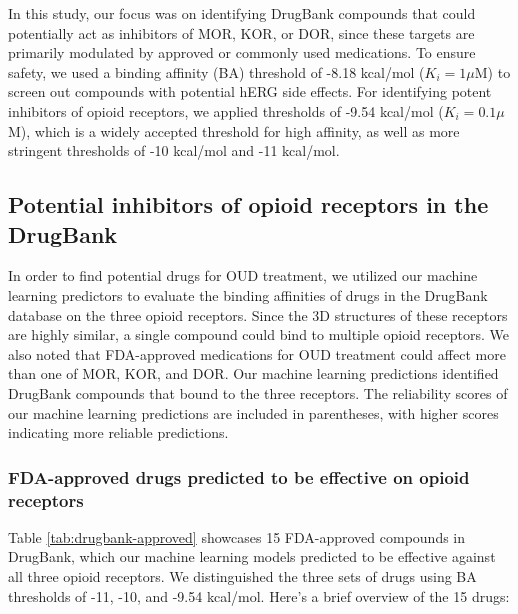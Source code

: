 \documentclass[10pt]{article}
\begin{document}
		
		In this study, our focus was on identifying DrugBank compounds that could potentially act as inhibitors of MOR, KOR, or DOR, since these targets are primarily modulated by approved or commonly used medications. To ensure safety, we used a binding affinity (BA) threshold of -8.18 kcal/mol ($K_i=1\mu$M) to screen out compounds with potential hERG side effects. For identifying potent inhibitors of opioid receptors, we applied thresholds of -9.54 kcal/mol ($K_i=0.1\mu$M), which is a widely accepted threshold for high affinity\cite{flower2002drug}, as well as more stringent thresholds of -10 kcal/mol and -11 kcal/mol.
		
		
		\subsection{Potential inhibitors of opioid receptors in the DrugBank}
		
		
		In order to find potential drugs for OUD treatment, we utilized our machine learning predictors to evaluate the binding affinities of drugs in the DrugBank database on the three opioid receptors. Since the 3D structures of these receptors are highly similar, a single compound could bind to multiple opioid receptors. We also noted that FDA-approved medications for OUD treatment could affect more than one of MOR, KOR, and DOR. Our machine learning predictions identified DrugBank compounds that bound to the three receptors. The reliability scores of our machine learning predictions are included in parentheses, with higher scores indicating more reliable predictions.
		
		\subsubsection{FDA-approved drugs predicted to be effective on opioid receptors}
		
		
		Table \ref{tab:drugbank-approved} showcases 15 FDA-approved compounds in DrugBank, which our machine learning models predicted to be effective against all three opioid receptors. We distinguished the three sets of drugs using BA thresholds of -11, -10, and -9.54 kcal/mol. Here's a brief overview of the 15 drugs:
		
\end{document}
